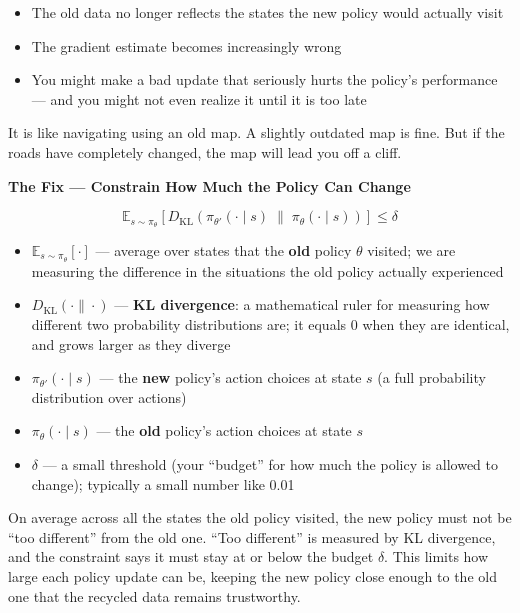 \begin{itemize}
  \item The old data no longer reflects the states the new policy would actually visit
  \item The gradient estimate becomes increasingly wrong
  \item You might make a bad update that seriously hurts the policy's performance --- and you might
    not even realize it until it is too late
\end{itemize}

It is like navigating using an old map. A slightly outdated map is fine. But if the roads have
completely changed, the map will lead you off a cliff.

\textbf{The Fix --- Constrain How Much the Policy Can Change}

\[
\mathbb{E}_{s \sim \pi_\theta}
\left[
  D_{\mathrm{KL}}\!\left(\pi_{\theta'}(\cdot \mid s) \;\|\; \pi_\theta(\cdot \mid s)\right)
\right]
\leq \delta
\]

\begin{itemize}
  \item $\mathbb{E}_{s \sim \pi_\theta}[\cdot]$ --- average over states that the \textbf{old}
    policy $\theta$ visited; we are measuring the difference in the situations the old policy
    actually experienced
  \item $D_{\mathrm{KL}}(\cdot \| \cdot)$ --- \textbf{KL divergence}: a mathematical ruler for
    measuring how different two probability distributions are; it equals 0 when they are identical,
    and grows larger as they diverge
  \item $\pi_{\theta'}(\cdot \mid s)$ --- the \textbf{new} policy's action choices at state $s$
    (a full probability distribution over actions)
  \item $\pi_\theta(\cdot \mid s)$ --- the \textbf{old} policy's action choices at state $s$
  \item $\delta$ --- a small threshold (your ``budget'' for how much the policy is allowed to
    change); typically a small number like 0.01
\end{itemize}

On average across all the states the old policy visited, the new policy must not be ``too
different'' from the old one. ``Too different'' is measured by KL divergence, and the constraint
says it must stay at or below the budget $\delta$. This limits how large each policy update can be,
keeping the new policy close enough to the old one that the recycled data remains trustworthy.

